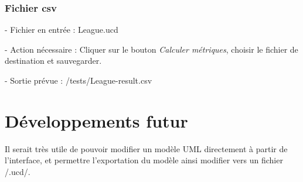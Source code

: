 \documentclass[letter,french]{report}
\begin{document}
  \subsubsection{Fichier csv}
  - Fichier en entrée : League.ucd

  - Action nécessaire : Cliquer sur le bouton \emph{Calculer métriques},
  choisir le fichier de destination et sauvegarder.

  - Sortie prévue : /tests/League-result.csv
  

	\section*{Développements futur}
	Il serait très utile de pouvoir modifier un modèle UML directement à partir de l'interface,
	et permettre l'exportation du modèle ainsi modifier vers un fichier /.ucd/.
	
\end{document}

